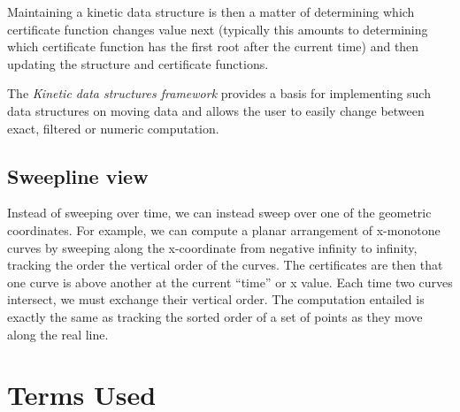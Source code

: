Maintaining a kinetic data structure is then a matter of determining
which certificate function changes value next (typically this amounts
to determining which certificate function has the first root after the
current time) and then updating the structure and certificate
functions.

The {\em Kinetic data structures framework} provides a basis for
implementing such data structures on moving data and allows the user
to easily change between exact, filtered or numeric computation.

\subsection{Sweepline view}

Instead of sweeping over time, we can instead sweep over one of the
geometric coordinates. For example, we can compute a planar
arrangement of x-monotone curves by sweeping along the x-coordinate
from negative infinity to infinity, tracking the order the vertical
order of the curves. The certificates are then that one curve is above
another at the current ``time'' or x value. Each time two curves
intersect, we must exchange their vertical order. The computation
entailed is exactly the same as tracking the sorted order of a set of
points as they move along the real line.

\section{Terms Used}
\label{sec:kds_terms}

